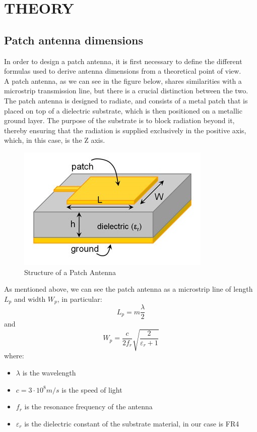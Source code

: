 \documentclass[]{article}
\begin{document}
	\section{THEORY} 
	\subsection{Patch antenna dimensions}
	In order to design a patch antenna, it is first necessary to define the different formulas used to derive antenna dimensions from a theoretical point of view.\\
	A patch antenna, as we can see in the figure below, shares similarities with a microstrip transmission line, but there is a crucial distinction between the two. The patch antenna is designed to radiate, and consists of a metal patch that is placed on top of a dielectric substrate, which is then positioned on a metallic ground layer. The purpose of the substrate is to block radiation beyond it, thereby ensuring that the radiation is supplied exclusively in the positive axis, which, in this case, is the Z axis.\\
	\begin{figure}[h]
		\centering
		\includegraphics[width=0.4\linewidth]{img/img1}
		\caption{Structure of a Patch Antenna}
		\label{fig:img1}
	\end{figure}
	
	As mentioned above, we can see the patch antenna as a microstrip line of length $L_p$ and width $W_p$, in particular: 
	\begin{equation}
		L_p=m\frac{\lambda}{2}
	\end{equation} 
	and 
	\begin{equation}
		W_p=\frac{c}{2f_r}\sqrt{\frac{2}{\varepsilon_r+1}}
		\label{Wp}
	\end{equation}
	where: 
	\begin{itemize}
		\item $\lambda$ is the wavelength 
		\item $c=3 \cdot 10^8 m/s$ is the speed of light
		\item $f_r$ is the resonance frequency of the antenna
		\item $\varepsilon_r$ is the dielectric constant of the substrate material, in our case is FR4
		
	\end{itemize}
\end{document}
